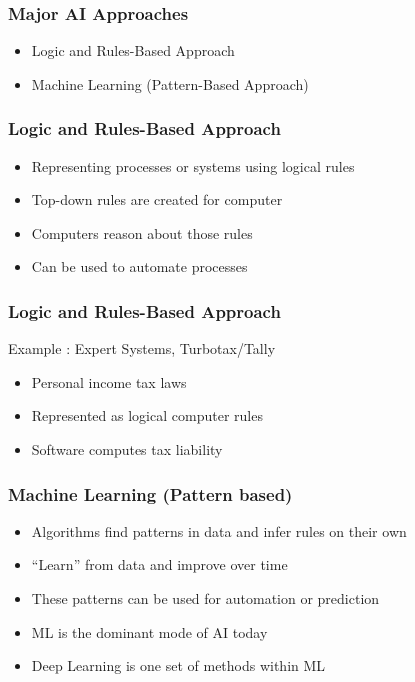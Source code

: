 \begin{frame}[fragile]\frametitle{Major AI Approaches}
\begin{itemize}
\item  Logic and Rules-Based Approach
\item  Machine Learning (Pattern-Based Approach)
\end{itemize}
\end{frame}

\begin{frame}[fragile]\frametitle{Logic and Rules-Based Approach}
\begin{itemize}
\item  Representing processes or systems using logical rules
\item Top-down rules are created for computer
\item Computers reason about those rules
\item Can be used to automate processes
\end{itemize}
\end{frame}

\begin{frame}[fragile]\frametitle{Logic and Rules-Based Approach}
Example :  Expert Systems, Turbotax/Tally
\begin{itemize}
\item  Personal income tax laws 
\item  Represented as logical computer rules
\item  Software computes tax liability
\end{itemize}
\end{frame}

\begin{frame}[fragile]\frametitle{Machine Learning (Pattern based)}
\begin{itemize}
\item  Algorithms find patterns in data and infer rules on their own
\item   ``Learn'' from data and improve over time
\item  These patterns can be used for automation or prediction
\item  ML is the dominant mode of AI today
\item Deep Learning is one set of methods within ML
\end{itemize}
\end{frame}

